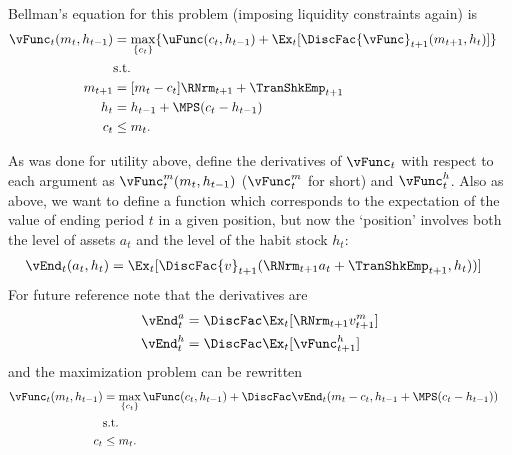 \documentclass[titlepage, headings=optiontotocandhead]{\econtex}
\begin{document}
{  Bellman's equation for this problem (imposing liquidity constraints again) is
  \begin{equation}\begin{gathered}\begin{aligned}
        {\vFunc}_{t}({m}_{t},h_{t-1})  & = \max_{\{{c}_{t}\}}  \{\uFunc({c}_{t},h_{t-1}) +
        \Ex_{t}[\DiscFac  {\vFunc}_{t+1}({m}_{t+1},h_{t}) ]\}
        \\ & \text{s.t.} & \nonumber \\
        {m}_{t+1}  & = [{m}_{t}-{c}_{t}]\RNrm_{t+1} + \TranShkEmp_{t+1}\\
        h_{t}  & = h_{t-1} + \MPS ({c}_{t} - h_{t-1} ) \\
        {c}_{t} & \leq  {m}_{t} .
      \end{aligned}\end{gathered}\end{equation}

  As was done for utility above, define the derivatives of ${\vFunc}_{t}$ with
  respect to each argument as ${\vFunc}_{t}^{m}({m}_{t},h_{t-1})$ (${\vFunc}_{t}^{m}$
  for short) and ${\vFunc}_{t}^{h}$.  Also as above, we want to
  define a function which corresponds to the expectation of the value of
  ending period $t$ in a given position, but now the `position'
  involves both the level of assets ${a}_{t}$ and the level of the habit
  stock $h_{t}$:
  \begin{equation}\begin{gathered}\begin{aligned}
        \vEnd_{t}({a}_{t},h_{t})  & = \Ex_{t}[\DiscFac {v}_{t+1}(\RNrm_{t+1} {a}_{t}+{\TranShkEmp}_{t+1},h_{t}))]
      \end{aligned}\end{gathered}\end{equation}
  For future reference note that the derivatives are
  \begin{equation}\begin{gathered}\begin{aligned}
        \vEnd_{t}^{{a}}  & = \DiscFac \Ex_{t} [\RNrm_{t+1} {v}_{t+1}^{m}] \label{eq:vEndsdefn} \\
        \vEnd_{t}^{h}  & = \DiscFac \Ex_{t} [{\vFunc}_{t+1}^{h}] \label{eq:vEndhdefn}
      \end{aligned}\end{gathered}\end{equation}
  and the maximization problem can be rewritten
  \begin{equation}\begin{gathered}\begin{aligned}
        {\vFunc}_{t}({m}_{t},h_{t-1}) 
        & =                                         \max_{\{{c}_{t}\}} %
        \uFunc({c}_{t},h_{t-1})  +  \DiscFac
        \vEnd_{t}({m}_{t}-{c}_{t},h_{t-1}+\MPS({c}_{t}-h_{t-1}))
        \\        & \text{s.t.} & \nonumber
        \\  {c}_{t} & \leq  {m}_{t}.
      \end{aligned}\end{gathered}\end{equation}

}
\end{document}
